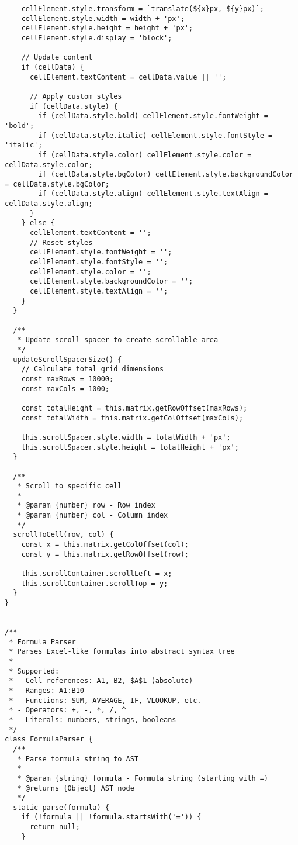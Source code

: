 \documentclass[11pt]{article}
\begin{document}
\begin{verbatim}
    cellElement.style.transform = `translate(${x}px, ${y}px)`;
    cellElement.style.width = width + 'px';
    cellElement.style.height = height + 'px';
    cellElement.style.display = 'block';
    
    // Update content
    if (cellData) {
      cellElement.textContent = cellData.value || '';
      
      // Apply custom styles
      if (cellData.style) {
        if (cellData.style.bold) cellElement.style.fontWeight = 'bold';
        if (cellData.style.italic) cellElement.style.fontStyle = 'italic';
        if (cellData.style.color) cellElement.style.color = cellData.style.color;
        if (cellData.style.bgColor) cellElement.style.backgroundColor = cellData.style.bgColor;
        if (cellData.style.align) cellElement.style.textAlign = cellData.style.align;
      }
    } else {
      cellElement.textContent = '';
      // Reset styles
      cellElement.style.fontWeight = '';
      cellElement.style.fontStyle = '';
      cellElement.style.color = '';
      cellElement.style.backgroundColor = '';
      cellElement.style.textAlign = '';
    }
  }
  
  /**
   * Update scroll spacer to create scrollable area
   */
  updateScrollSpacerSize() {
    // Calculate total grid dimensions
    const maxRows = 10000;
    const maxCols = 1000;
    
    const totalHeight = this.matrix.getRowOffset(maxRows);
    const totalWidth = this.matrix.getColOffset(maxCols);
    
    this.scrollSpacer.style.width = totalWidth + 'px';
    this.scrollSpacer.style.height = totalHeight + 'px';
  }
  
  /**
   * Scroll to specific cell
   * 
   * @param {number} row - Row index
   * @param {number} col - Column index
   */
  scrollToCell(row, col) {
    const x = this.matrix.getColOffset(col);
    const y = this.matrix.getRowOffset(row);
    
    this.scrollContainer.scrollLeft = x;
    this.scrollContainer.scrollTop = y;
  }
}


/**
 * Formula Parser
 * Parses Excel-like formulas into abstract syntax tree
 * 
 * Supported:
 * - Cell references: A1, B2, $A$1 (absolute)
 * - Ranges: A1:B10
 * - Functions: SUM, AVERAGE, IF, VLOOKUP, etc.
 * - Operators: +, -, *, /, ^
 * - Literals: numbers, strings, booleans
 */
class FormulaParser {
  /**
   * Parse formula string to AST
   * 
   * @param {string} formula - Formula string (starting with =)
   * @returns {Object} AST node
   */
  static parse(formula) {
    if (!formula || !formula.startsWith('=')) {
      return null;
    }
    

\end{verbatim}
\end{document}
